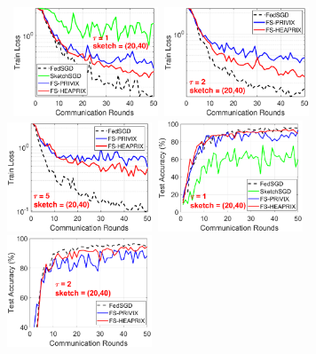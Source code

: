 \documentclass[twoside]{article}
\begin{document}
\begin{figure}[H]
	\begin{center}
		\mbox{			   
		\includegraphics[width=1.7in]{MNIST_figures/local1_sketch20_iid0_train_loss.eps} \hspace{-0.2in}
		\includegraphics[width=1.7in]{MNIST_figures/local2_sketch20_iid0_train_loss.eps} \hspace{-0.2in}
		\includegraphics[width=1.7in]{MNIST_figures/local5_sketch20_iid0_train_loss.eps} \hspace{-0.2in}
				\includegraphics[width=1.7in]{MNIST_figures/local1_sketch20_iid0_test_acc.eps} \hspace{-0.2in}
		}
		\mbox{
		\includegraphics[width=1.7in]{MNIST_figures/local2_sketch20_iid0_test_acc.eps} \hspace{-0.2in}
}
\end{center}
\end{figure}
\end{document}
